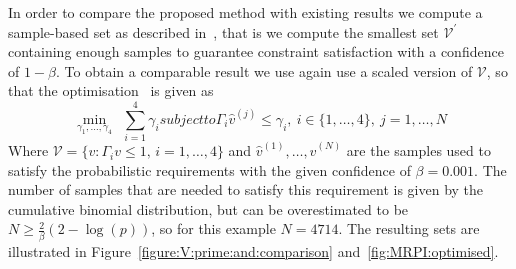 \documentclass{ifacconf}
\providecommand{\V}{\mathcal V}
\providecommand{\bfa}[1]{\mathbf{#1}}
\begin{document}
In order to compare the proposed method with existing results we compute a sample-based set as described in~\cite{Zhang2015}, that is we compute the smallest set $\V^\prime$ containing enough samples to guarantee constraint satisfaction with a confidence of $1-\beta$.
%
To obtain a comparable result we use again use a scaled version of $\V$, so that the optimisation~\citep[eq.~(10)]{Zhang2015} is given as
%
\begin{subequations}\label{eq:comparison:set}
\begin{equation}\min_{\gamma_1,\dots,\gamma_4} \  \ \sum_{i=1}^4\gamma_i
\end{equation}
subject to 
\begin{equation}
\Gamma_i \hat{v}^{(j)}\leq \gamma_i ,\ i\in\{1,\ldots,4\}, \ j = 1,\ldots,N
\end{equation}
\end{subequations}
%
Where $\V = \{v : \Gamma_i v \leq 1, \, i =1, \ldots ,4\}$ and
$\hat{v}^{(1)},\ldots,\hat{v}^{(N)}$
are the samples used to satisfy the probabilistic requirements with the given confidence of $\beta=0.001$. The number of samples that are needed to satisfy this requirement is given by the cumulative binomial distribution, but can be overestimated to be $N \geq \frac{2}{\beta}(2-\log(p))$, so for this example $N = 4714$.
%
The resulting sets are illustrated in Figure~\ref{figure:V:prime:and:comparison} and~\ref{fig:MRPI:optimised}.
%
\end{document}
